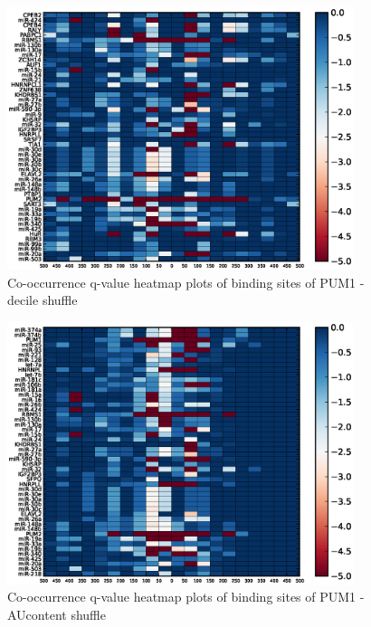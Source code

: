 \begin{figure}
   	\includegraphics[width=0.9\textwidth]{appendix1/figures/PUM1_decile_expressed_heatmap_qvalues0.eps}
   	\caption{Co-occurrence q-value heatmap plots of binding sites of PUM1 - decile shuffle}
\end{figure}
\clearpage
\begin{figure}
   	\includegraphics[width=0.9\textwidth]{appendix1/figures/PUM1_AUcontent_expressed_heatmap_qvalues0.eps}
   	\caption{Co-occurrence q-value heatmap plots of binding sites of PUM1 - AUcontent shuffle}
\end{figure}

